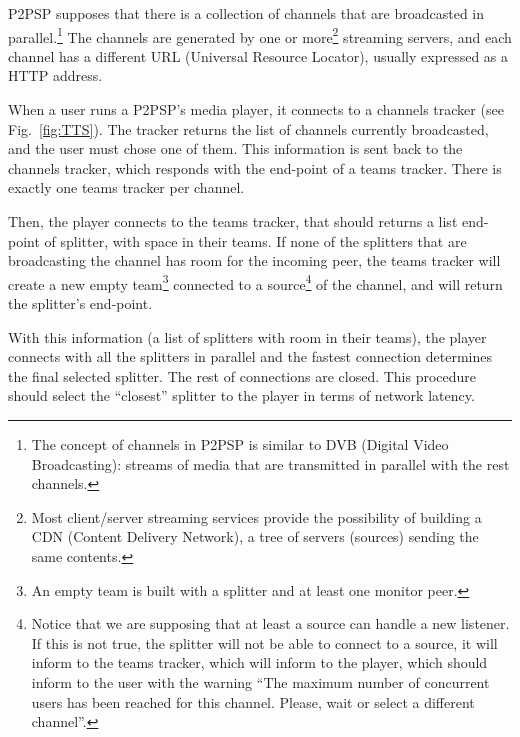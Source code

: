 \label{sec:TTS}
\begin{figure*}
   \caption{Entities and procedures involved in the
    process of determing a splitter (i.e. a team with room for an
    incoming peer) for a given channel.\label{fig:TTS}}
\end{figure*}

P2PSP supposes that there is a collection of channels that are
broadcasted in parallel.\footnote{The concept of channels in P2PSP is
  similar to DVB (Digital Video Broadcasting): streams of media that
  are transmitted in parallel with the rest channels.} The channels
are generated by one or more\footnote{Most client/server streaming
  services provide the possibility of building a CDN (Content Delivery
  Network), a tree of servers (sources) sending the same contents.}
streaming servers, and each channel has a different URL (Universal
Resource Locator), usually expressed as a HTTP address.

When a user runs a P2PSP's media player, it connects to a channels
tracker (see Fig.~\ref{fig:TTS}). The tracker returns the list of
channels currently broadcasted, and the user must chose one of
them. This information is sent back to the channels tracker, which
responds with the end-point of a teams tracker. There is exactly one
teams tracker per channel.

Then, the player connects to the teams tracker, that should returns a
list end-point of splitter, with space in their teams. If none of the
splitters that are broadcasting the channel has room for the incoming
peer, the teams tracker will create a new empty team\footnote{An empty
  team is built with a splitter and at least one monitor peer.}
connected to a source\footnote{Notice that we are supposing that at
  least a source can handle a new listener. If this is not true, the
  splitter will not be able to connect to a source, it will inform to
  the teams tracker, which will inform to the player, which should
  inform to the user with the warning ``The maximum number of
  concurrent users has been reached for this channel. Please, wait or
  select a different channel''.} of the channel, and will return the
splitter's end-point.

With this information (a list of splitters with room in their teams),
the player connects with all the splitters in parallel and the fastest
connection determines the final selected splitter. The rest of
connections are closed. This procedure should select the ``closest''
splitter to the player in terms of network latency.

